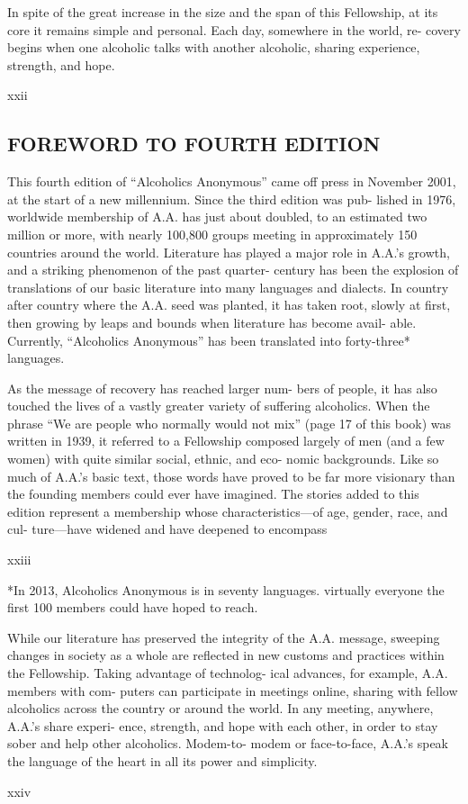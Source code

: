 In spite of the great increase in the size and the
span of this Fellowship, at its core it remains simple
and personal. Each day, somewhere in the world, re-
covery begins when one alcoholic talks with another
alcoholic, sharing experience, strength, and hope.

xxii


\subsection{FOREWORD TO FOURTH EDITION}

This fourth edition of “Alcoholics Anonymous”
came off press in November 2001, at the start of
a new millennium. Since the third edition was pub-
lished in 1976, worldwide membership of A.A. has just
about doubled, to an estimated two million or more,
with nearly 100,800 groups meeting in approximately
150 countries around the world. 
Literature has played a major role in A.A.’s growth,
and a striking phenomenon of the past quarter-
century has been the explosion of translations of our
basic literature into many languages and dialects. In
country after country where the A.A. seed was
planted, it has taken root, slowly at ﬁrst, then growing
by leaps and bounds when literature has become avail-
able. Currently, “Alcoholics Anonymous” has been
translated into forty-three* languages.

As the message of recovery has reached larger num-
bers of people, it has also touched the lives of a vastly
greater variety of suffering alcoholics. When the
phrase “We are people who normally would not mix”
(page 17 of this book) was written in 1939, it referred
to a Fellowship composed largely of men (and a few
women) with quite similar social, ethnic, and eco-
nomic backgrounds. Like so much of A.A.’s basic text,
those words have proved to be far more visionary than
the founding members could ever have imagined. The
stories added to this edition represent a membership
whose characteristics—of age, gender, race, and cul-
ture—have widened and have deepened to encompass

xxiii

*In 2013, Alcoholics Anonymous is in seventy languages.
virtually everyone the ﬁrst 100 members could have
hoped to reach.

While our literature has preserved the integrity of
the A.A. message, sweeping changes in society as a
whole are reﬂected in new customs and practices
within the Fellowship. Taking advantage of technolog-
ical advances, for example, A.A. members with com-
puters can participate in meetings online, sharing with
fellow alcoholics across the country or around the
world. In any meeting, anywhere, A.A.’s share experi-
ence, strength, and hope with each other, in order to
stay sober and help other alcoholics. Modem-to-
modem or face-to-face, A.A.’s speak the language of
the heart in all its power and simplicity.

xxiv

